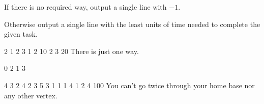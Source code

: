 
If there is no required way, output a single line with $-1$.

Otherwise output a single line with the least units of time needed to complete the given task.



 2 1 2 3
1 2 10
2 3 20
\sampleCOMMENT
There is just one way.
\sampleEND


\bigskip


 0 2 1 3
\sampleEND


\bigskip


 4 3 2 4
2 3 5
3 1 1
1 4 1
2 4 100
\sampleCOMMENT
You can't go twice through your home base nor any other vertex.
\sampleEND


